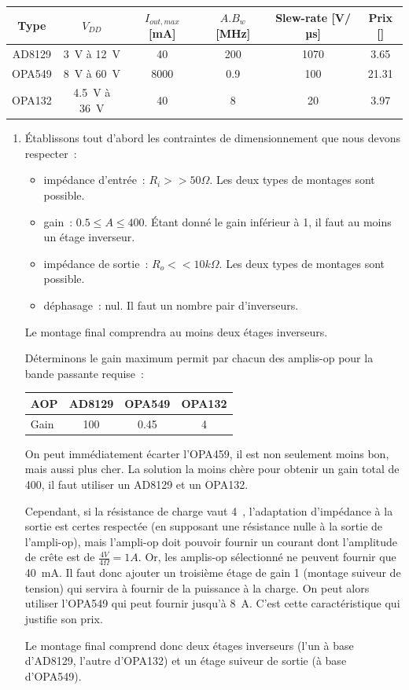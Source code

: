 \documentclass{../template/tp}
\begin{document}
{	\begin{center}
		\begin{tabular}{|c|c|c|c|c|c|} \hline
		Type & $V_{DD}$ & $I_{out, max}$ [mA] & $A.B_w$ [MHz] & Slew-rate [V/µs] & Prix [\EUR] \\ \hline
		AD8129 & 3~V à 12~V & 40 & 200 & 1070 & 3.65 \\ \hline %
		OPA549 & 8~V à 60~V & 8000 & 0.9 & 100 & 21.31 \\ \hline
		OPA132 & 4.5~V à 36~V & 40 & 8 & 20 & 3.97 \\ \hline
		\end{tabular}
	\end{center}
}
{
	\begin{enumerate}
		\item Établissons tout d'abord les contraintes de dimensionnement que nous devons respecter~:
		\begin{itemize}
			\item impédance d'entrée~: $R_i >> 50 \Omega$. Les deux types de montages sont possible.
			\item gain~: $0.5 \leq A \leq 400$. Étant donné le gain inférieur à 1, il faut au moins un étage inverseur.
			\item impédance de sortie~: $R_o << 10 k\Omega$. Les deux types de montages sont possible.
			\item déphasage~: nul. Il faut un nombre pair d'inverseurs.
		\end{itemize}

		Le montage final comprendra au moins deux étages inverseurs.

		Déterminons le gain maximum permit par chacun des amplis-op pour la bande passante requise~:

		\begin{center}
			\begin{tabular}{l|c|c|c}
			AOP & AD8129 & OPA549 & OPA132 \\ \hline
			Gain & 100 & 0.45 & 4 \\
			\end{tabular}
		\end{center}

		On peut immédiatement écarter l'OPA459, il est non seulement moins bon, mais aussi plus cher.
		La solution la moins chère pour obtenir un gain total de 400, il faut utiliser un AD8129 et un OPA132.

		Cependant, si la résistance de charge vaut 4~\ohm, l'adaptation d'impédance à la sortie est certes respectée (en supposant une résistance nulle à la sortie de l'ampli-op), mais l'ampli-op doit pouvoir fournir un courant dont l'amplitude de crête est de $\frac{4V}{4\Omega} = 1 A$.
		Or, les amplis-op sélectionné ne peuvent fournir que 40~mA.
		Il faut donc ajouter un troisième étage de gain 1 (montage suiveur de tension) qui servira à fournir de la puissance à la charge.
		On peut alors utiliser l'OPA549 qui peut fournir jusqu'à 8~A.
		C'est cette caractéristique qui justifie son prix.

		Le montage final comprend donc deux étages inverseurs (l'un à base d'AD8129, l'autre d'OPA132) et un étage suiveur de sortie (à base d'OPA549).
	\end{enumerate}
}
\end{document}
